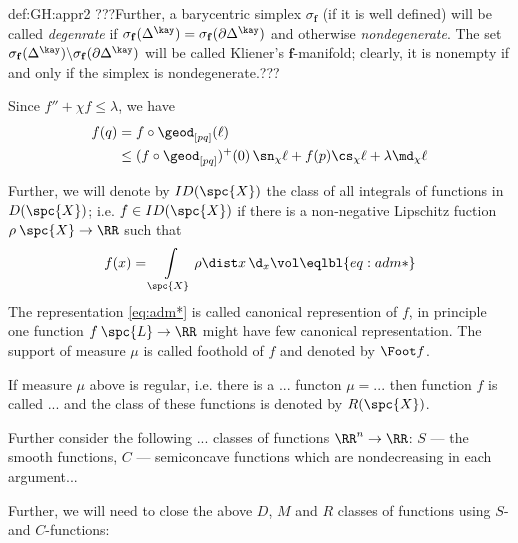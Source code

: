 {\begin{subthm}{def:GH:appr2}
???Further, a barycentric simplex $\sigma_\mathbf{f}$ (if it is well defined) will be called \emph{degenrate} if $\sigma_\mathbf{f}(\Delta^\kay)=\sigma_\mathbf{f}(\partial\Delta^\kay)$ and otherwise \emph{nondegenerate}.
The set $\sigma_\mathbf{f}(\Delta^\kay)\backslash\sigma_\mathbf{f}(\partial\Delta^\kay)$ will be called Kliener's $\mathbf{f}$-manifold; clearly, it is nonempty if and only if the simplex is nondegenerate.???















Since $f''+\chi f\le \lambda$, we have
\begin{align*}
{f(q)}&=f\circ\geod_{[p q]}(\ell)\\
&\le(f\circ\geod_{[p q]})^+(0)\,{\sn_\chi\ell}+f(p)\cs_\chi\ell+\lambda\md_\chi\ell
\end{align*}




















Further, we will denote by $ID(\spc{X})$ the class of all integrals of functions in $D(\spc{X})$;
i.e. $f\in ID(\spc{X})$ if there is a non-negative Lipschitz fuction $\rho\:\spc{X}\to\RR$ such that 
$$f(x)=\int\limits_\spc{X}\rho\dist x\,\d_x\vol\eqlbl{eq:adm*}$$
The representation \ref{eq:adm*} is called canonical represention of $f$, in principle one function $f\:\spc{L}\to \RR$ might have few canonical representation.
The support of measure $\mu$ is called foothold of $f$ and denoted by $\Foot f$.

If measure $\mu$ above is regular, i.e. there is a ... functon $\mu=...$ then function $f$ is called ... and the class of these functions is denoted by $R(\spc{X})$.

Further consider the following ... classes of functions $\RR^n\to\RR$:
$S$ --- the smooth functions, $C$ --- semiconcave functions which are nondecreasing in each argument...



Further, we will need to close the above $D$, $M$ and $R$ classes of functions using $S$- and $C$-functions:





















\end{subthm}}
